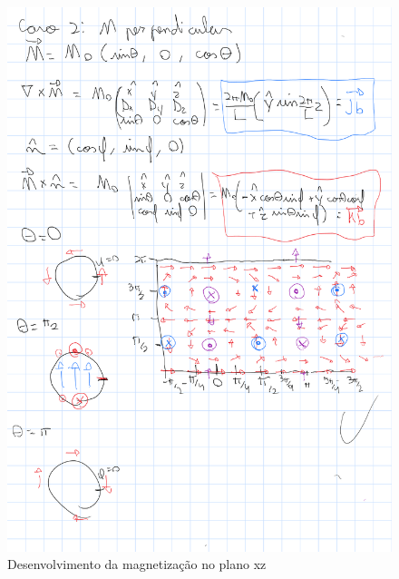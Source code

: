 \documentclass[a4paper, 12pt, twocolumn]{article}
\begin{document}
\begin{figure}
    \caption{Desenvolvimento da magnetização no plano xz}
    \label{fig:m2}
    \centering
    \includegraphics[width=1\textwidth]{m2.png}
\end{figure}
\end{document}
